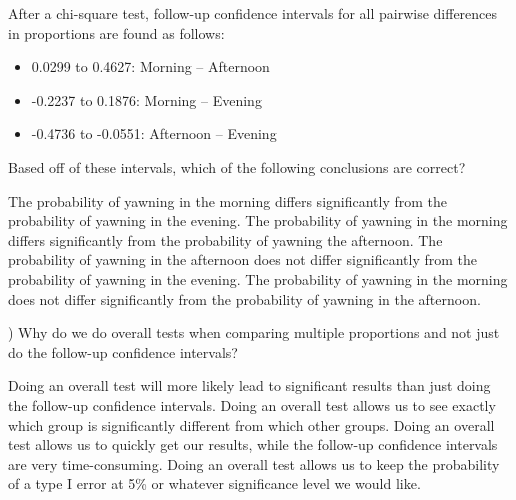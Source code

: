 \documentclass{article}
\begin{document}
\begin{mcquestions}
		\question[follow] After a chi-square test, follow-up confidence intervals for all pairwise differences in proportions are found as follows:
		\begin{itemize}
			\item 0.0299 to 0.4627:  Morning – Afternoon
			\item -0.2237 to 0.1876:  Morning – Evening
			\item -0.4736 to -0.0551:  Afternoon – Evening
		\end{itemize}
		Based off of these intervals, which of the following conclusions are correct?
		\begin{mcanswerslist}
			\answer The probability of yawning in the morning differs significantly from the probability of yawning in the evening.
			\answer[correct] The probability of yawning in the morning differs significantly from the probability of yawning the afternoon.
			\answer The probability of yawning in the afternoon does not differ significantly from the probability of yawning in the evening.
			\answer The probability of yawning in the morning does not differ significantly from the probability of yawning in the afternoon.
		\end{mcanswerslist}
		
		
		) Why do we do overall tests when comparing multiple proportions and not just do the follow-up confidence intervals?
		\begin{mcanswerslist}
			\answer[correct] Doing an overall test will more likely lead to significant results than just doing the follow-up confidence intervals.
			\answer Doing an overall test allows us to see exactly which group is significantly different from which other groups.
			\answer Doing an overall test allows us to quickly get our results, while the follow-up confidence intervals are very time-consuming.
			\answer Doing an overall test allows us to keep the probability of a type I error at 5\% or whatever significance level we would like.
		\end{mcanswerslist}
		

\end{mcquestions}
\end{document}
